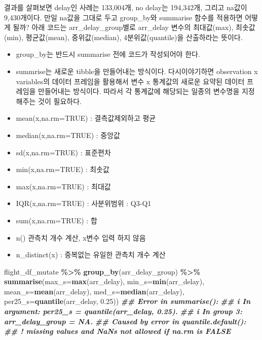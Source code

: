 \documentclass[
]{book}
\newenvironment{Shaded}{\begin{snugshade}}{\end{snugshade}}
\newcommand{\AttributeTok}[1]{\textcolor[rgb]{0.13,0.29,0.53}{#1}}
\newcommand{\DocumentationTok}[1]{\textcolor[rgb]{0.56,0.35,0.01}{\textbf{\textit{#1}}}}
\newcommand{\FloatTok}[1]{\textcolor[rgb]{0.00,0.00,0.81}{#1}}
\newcommand{\FunctionTok}[1]{\textcolor[rgb]{0.13,0.29,0.53}{\textbf{#1}}}
\newcommand{\NormalTok}[1]{#1}
\newcommand{\SpecialCharTok}[1]{\textcolor[rgb]{0.81,0.36,0.00}{\textbf{#1}}}
\providecommand{\tightlist}{%
  \setlength{\itemsep}{0pt}\setlength{\parskip}{0pt}}
\begin{document}
결과를 살펴보면 delay인 사례는 133,004개, no delay는 194,342개, 그리고 na값이 9,430개이다. 만일 na값을 그대로 두고 group\_by와 summarise 함수를 적용하면 어떻게 될까? 아래 코드는 arr\_delay\_group별로 arr\_delay 변수의 최대값(max), 최솟값(min), 평균값(mean), 중위값(median), 4분위값(quantile)을 산출하라는 뜻이다.

\begin{itemize}
\tightlist
\item
  group\_by는 반드시 summarise 전에 코드가 작성되어야 한다.
\item
  summrise는 새로운 tibble을 만들어내는 방식이다. 다시이야기하면 observation x variables의 데이터 프레임을 활용해서 변수 x 통계값의 새로운 요약된 데이터 프레임을 만들어내는 방식이다. 따라서 각 통계값에 해당되는 일종의 변수명을 지정해주는 것이 필요하다.
\item
  mean(x,na.rm=TRUE) : 결측값제외하고 평균
\item
  median(x,na.rm=TRUE) : 중앙값
\item
  sd(x,na.rm=TRUE) : 표준편차
\item
  min(x,na.rm=TRUE) : 최솟값
\item
  max(x,na.rm=TRUE) : 최대값
\item
  IQR(x,na.rm=TRUE) : 사분위범위 : Q3-Q1
\item
  sum(x,na.rm=TRUE) : 합
\item
  n() 관측치 개수 계산, x변수 입력 하지 않음
\item
  n\_distinct(x) : 중복없는 유일한 관측치 개수 계산
\end{itemize}

\begin{Shaded}
\begin{Highlighting}[]
\NormalTok{flight\_df\_mutate }\SpecialCharTok{\%\textgreater{}\%} 
  \FunctionTok{group\_by}\NormalTok{(arr\_delay\_group) }\SpecialCharTok{\%\textgreater{}\%} 
  \FunctionTok{summarise}\NormalTok{(}\AttributeTok{max\_s=}\FunctionTok{max}\NormalTok{(arr\_delay),}
            \AttributeTok{min\_s=}\FunctionTok{min}\NormalTok{(arr\_delay), }
            \AttributeTok{mean\_s=}\FunctionTok{mean}\NormalTok{(arr\_delay), }
            \AttributeTok{med\_s=}\FunctionTok{median}\NormalTok{(arr\_delay), }
            \AttributeTok{per25\_s=}\FunctionTok{quantile}\NormalTok{(arr\_delay, }\FloatTok{0.25}\NormalTok{))}
\DocumentationTok{\#\# Error in \textasciigrave{}summarise()\textasciigrave{}:}
\DocumentationTok{\#\# i In argument: \textasciigrave{}per25\_s = quantile(arr\_delay, 0.25)\textasciigrave{}.}
\DocumentationTok{\#\# i In group 3: \textasciigrave{}arr\_delay\_group = NA\textasciigrave{}.}
\DocumentationTok{\#\# Caused by error in \textasciigrave{}quantile.default()\textasciigrave{}:}
\DocumentationTok{\#\# ! missing values and NaN\textquotesingle{}s not allowed if \textquotesingle{}na.rm\textquotesingle{} is FALSE}
\end{Highlighting}
\end{Shaded}
\end{document}
